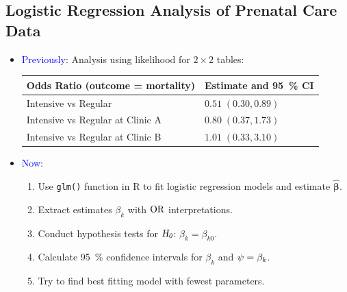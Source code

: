 \documentclass[oneside]{book}\usepackage[]{graphicx}\usepackage[svgnames]{xcolor}
\let\exp\relax%
\let\log\relax%
\newcommand{\HN}{\textsl{H}_{\textsl{0}}}%
\providecommand{\Vector}[1]{\bm{#1}}%
\begin{document}
\subsection*{Logistic Regression Analysis of Prenatal Care Data}
\begin{itemize}
      \item \textcolor{Blue}{Previously}: Analysis using likelihood for $ 2\times 2 $ tables:
            \begin{table}[!htbp]
                  \centering
                  \begin{NiceTabular}{ll}
                        Odds Ratio (outcome = mortality) & Estimate and \qty{95}{\percent} CI\\
                        \midrule
                        Intensive vs Regular & $ 0.51\; (0.30,0.89) $\\
                        Intensive vs Regular at Clinic A & $ 0.80\; (0.37,1.73) $\\
                        Intensive vs Regular at Clinic B & $ 1.01\; (0.33,3.10) $\\
                        \midrule
                  \end{NiceTabular}
            \end{table}
      \item \textcolor{Blue}{Now}:
            \begin{enumerate}[1.]
                  \item Use \texttt{glm()} function in R to fit logistic regression models and estimate $ \hat{\Vector{\beta}} $.
                  \item Extract estimates $ \beta_k $ with $ \log{\text{OR}} $ interpretations.
                  \item Conduct hypothesis tests for $ \HN $: $ \beta_k=\beta_{k0} $.
                  \item Calculate \qty{95}{\percent} confidence intervals for $ \beta_k $ and $ \psi=\exp{\beta_k} $.
                  \item Try to find best fitting model with fewest parameters.
            \end{enumerate}
\end{itemize}
\end{document}
